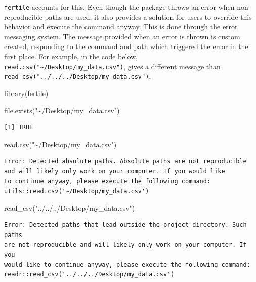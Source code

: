 \documentclass[12pt,twoside]{reedthesis}
\newenvironment{Shaded}{\begin{snugshade}}{\end{snugshade}}
\newcommand{\FunctionTok}[1]{\textcolor[rgb]{0.00,0.00,0.00}{#1}}
\newcommand{\NormalTok}[1]{#1}
\newcommand{\StringTok}[1]{\textcolor[rgb]{0.31,0.60,0.02}{#1}}
\begin{document}
\texttt{fertile} accounts for this. Even though the package throws an error when non-reproducible paths are used, it also provides a solution for users to override this behavior and execute the command anyway. This is done through the error messaging system. The message provided when an error is thrown is custom created, responding to the command and path which triggered the error in the first place. For example, in the code below, \texttt{read.csv("\textasciitilde{}/Desktop/my\_data.csv")}, gives a different message than \texttt{read\_csv("../../../Desktop/my\_data.csv")}.
\begin{Shaded}
\begin{Highlighting}[]
\FunctionTok{library}\NormalTok{(fertile)}
\end{Highlighting}
\end{Shaded}
\begin{Shaded}
\begin{Highlighting}[]
\FunctionTok{file.exists}\NormalTok{(}\StringTok{"\textasciitilde{}/Desktop/my\_data.csv"}\NormalTok{)}
\end{Highlighting}
\end{Shaded}
\begin{verbatim}
[1] TRUE
\end{verbatim}
\begin{Shaded}
\begin{Highlighting}[]
\FunctionTok{read.csv}\NormalTok{(}\StringTok{"\textasciitilde{}/Desktop/my\_data.csv"}\NormalTok{)}
\end{Highlighting}
\end{Shaded}
\begin{verbatim}
Error: Detected absolute paths. Absolute paths are not reproducible
and will likely only work on your computer. If you would like
to continue anyway, please execute the following command:
utils::read.csv('~/Desktop/my_data.csv')
\end{verbatim}
\begin{Shaded}
\begin{Highlighting}[]
\FunctionTok{read\_csv}\NormalTok{(}\StringTok{"../../../Desktop/my\_data.csv"}\NormalTok{)}
\end{Highlighting}
\end{Shaded}
\begin{verbatim}
Error: Detected paths that lead outside the project directory. Such paths
are not reproducible and will likely only work on your computer. If you
would like to continue anyway, please execute the following command:
readr::read_csv('../../../Desktop/my_data.csv')
\end{verbatim}
\end{document}
